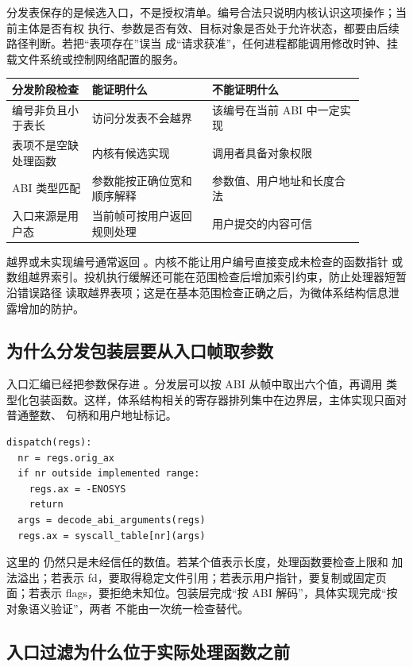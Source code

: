 分发表保存的是候选入口，不是授权清单。编号合法只说明内核认识这项操作；当前主体是否有权
执行、参数是否有效、目标对象是否处于允许状态，都要由后续路径判断。若把“表项存在”误当
成“请求获准”，任何进程都能调用修改时钟、挂载文件系统或控制网络配置的服务。

\begin{longtable}{|L{0.20\linewidth}|L{0.30\linewidth}|L{0.38\linewidth}|}
\hline
分发阶段检查 & 能证明什么 & 不能证明什么 \\ \hline
编号非负且小于表长 & 访问分发表不会越界 & 该编号在当前 ABI 中一定实现 \\ \hline
表项不是空缺处理函数 & 内核有候选实现 & 调用者具备对象权限 \\ \hline
ABI 类型匹配 & 参数能按正确位宽和顺序解释 & 参数值、用户地址和长度合法 \\ \hline
入口来源是用户态 & 当前帧可按用户返回规则处理 & 用户提交的内容可信 \\ \hline
\end{longtable}

越界或未实现编号通常返回 。内核不能让用户编号直接变成未检查的函数指针
或数组越界索引。投机执行缓解还可能在范围检查后增加索引约束，防止处理器短暂沿错误路径
读取越界表项；这是在基本范围检查正确之后，为微体系结构信息泄露增加的防护。

\subsection{为什么分发包装层要从入口帧取参数}

入口汇编已经把参数保存进 。分发层可以按 ABI 从帧中取出六个值，再调用
类型化包装函数。这样，体系结构相关的寄存器排列集中在边界层，主体实现只面对普通整数、
句柄和用户地址标记。

\begin{lstlisting}
dispatch(regs):
  nr = regs.orig_ax
  if nr outside implemented range:
    regs.ax = -ENOSYS
    return
  args = decode_abi_arguments(regs)
  regs.ax = syscall_table[nr](args)
\end{lstlisting}

这里的  仍然只是未经信任的数值。若某个值表示长度，处理函数要检查上限和
加法溢出；若表示 fd，要取得稳定文件引用；若表示用户指针，要复制或固定页面；若表示
flags，要拒绝未知位。包装层完成“按 ABI 解码”，具体实现完成“按对象语义验证”，两者
不能由一次统一检查替代。

\subsection{入口过滤为什么位于实际处理函数之前}


